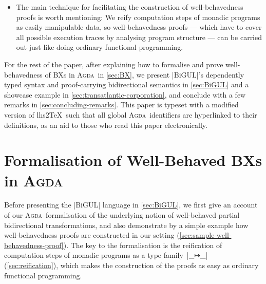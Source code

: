 \documentclass{sigplanconf}
\newcommand{\BiGUL}{\textsc{BiGUL}}
\newcommand{\Agda}{\textsc{Agda}}
\begin{document}
\begin{itemize}[leftmargin=*]
\item The main technique for facilitating the construction of well-behavedness proofs is worth mentioning: We reify computation steps of monadic programs as easily manipulable data, so well-behavedness proofs --- which have to cover all possible execution traces by analysing program structure --- can be carried out just like doing ordinary functional programming.
\end{itemize}
%


For the rest of the paper, after explaining how to formalise and prove well-behavedness of BXs in \Agda\ in \autoref{sec:BX}, we present |BiGUL|'s dependently typed syntax and proof-carrying bidirectional semantics in \autoref{sec:BiGUL} and a showcase example in \autoref{sec:transatlantic-corporation}, and conclude with a few remarks in \autoref{sec:concluding-remarks}.
This paper is typeset with a modified version of lhs2\TeX\ such that all global \Agda\ identifiers are hyperlinked to their definitions, as an aid to those who read this paper electronically.


\section{Formalisation of Well-Behaved BXs in \Agda}
\label{sec:BX}

Before presenting the |BiGUL| language in \autoref{sec:BiGUL}, we first give an account of our \Agda\ formalisation of the underlying notion of well-behaved partial bidirectional transformations, and also demonstrate by a simple example how well-behavedness proofs are constructed in our setting (\autoref{sec:sample-well-behavedness-proof}).
The key to the formalisation is the reification of computation steps of monadic programs as a type family~|_↦_| (\autoref{sec:reification}), which makes the construction of the proofs as easy as ordinary functional programming.
\end{document}
